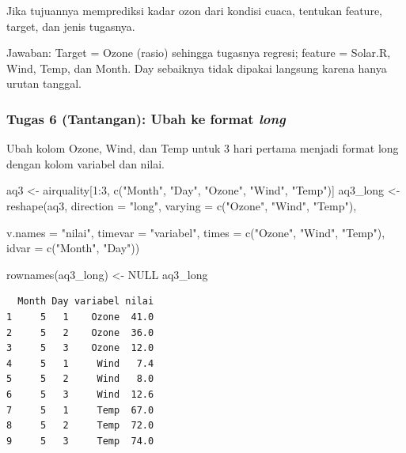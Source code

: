 \documentclass[
  indonesian,
  letterpaper,
]{book}
\newenvironment{Shaded}{\begin{snugshade}}{\end{snugshade}}
\newcommand{\AttributeTok}[1]{\textcolor[rgb]{0.40,0.45,0.13}{#1}}
\newcommand{\ConstantTok}[1]{\textcolor[rgb]{0.56,0.35,0.01}{#1}}
\newcommand{\DecValTok}[1]{\textcolor[rgb]{0.68,0.00,0.00}{#1}}
\newcommand{\FunctionTok}[1]{\textcolor[rgb]{0.28,0.35,0.67}{#1}}
\newcommand{\NormalTok}[1]{\textcolor[rgb]{0.00,0.23,0.31}{#1}}
\newcommand{\OtherTok}[1]{\textcolor[rgb]{0.00,0.23,0.31}{#1}}
\newcommand{\SpecialCharTok}[1]{\textcolor[rgb]{0.37,0.37,0.37}{#1}}
\newcommand{\StringTok}[1]{\textcolor[rgb]{0.13,0.47,0.30}{#1}}
\begin{document}
Jika tujuannya memprediksi kadar ozon dari kondisi cuaca, tentukan
feature, target, dan jenis tugasnya.

Jawaban: Target = Ozone (rasio) sehingga tugasnya regresi; feature =
Solar.R, Wind, Temp, dan Month. Day sebaiknya tidak dipakai langsung
karena hanya urutan tanggal.

\subsubsection{\texorpdfstring{Tugas 6 (Tantangan): Ubah ke format
\emph{long}}{Tugas 6 (Tantangan): Ubah ke format long}}\label{tugas-6-tantangan-ubah-ke-format-long}

Ubah kolom Ozone, Wind, dan Temp untuk 3 hari pertama menjadi format
long dengan kolom variabel dan nilai.

\begin{Shaded}
\begin{Highlighting}[]
\NormalTok{aq3 }\OtherTok{\textless{}{-}}\NormalTok{ airquality[}\DecValTok{1}\SpecialCharTok{:}\DecValTok{3}\NormalTok{, }\FunctionTok{c}\NormalTok{(}\StringTok{"Month"}\NormalTok{, }\StringTok{"Day"}\NormalTok{, }\StringTok{"Ozone"}\NormalTok{, }\StringTok{"Wind"}\NormalTok{, }\StringTok{"Temp"}\NormalTok{)]}
\NormalTok{aq3\_long }\OtherTok{\textless{}{-}} \FunctionTok{reshape}\NormalTok{(aq3, }\AttributeTok{direction =} \StringTok{"long"}\NormalTok{, }\AttributeTok{varying =} \FunctionTok{c}\NormalTok{(}\StringTok{"Ozone"}\NormalTok{, }\StringTok{"Wind"}\NormalTok{, }\StringTok{"Temp"}\NormalTok{),}

\AttributeTok{v.names =} \StringTok{"nilai"}\NormalTok{, }\AttributeTok{timevar =} \StringTok{"variabel"}\NormalTok{,}
\AttributeTok{times =} \FunctionTok{c}\NormalTok{(}\StringTok{"Ozone"}\NormalTok{, }\StringTok{"Wind"}\NormalTok{, }\StringTok{"Temp"}\NormalTok{), }\AttributeTok{idvar =} \FunctionTok{c}\NormalTok{(}\StringTok{"Month"}\NormalTok{, }\StringTok{"Day"}\NormalTok{))}

\FunctionTok{rownames}\NormalTok{(aq3\_long) }\OtherTok{\textless{}{-}} \ConstantTok{NULL}
\NormalTok{aq3\_long}
\end{Highlighting}
\end{Shaded}

\begin{verbatim}
  Month Day variabel nilai
1     5   1    Ozone  41.0
2     5   2    Ozone  36.0
3     5   3    Ozone  12.0
4     5   1     Wind   7.4
5     5   2     Wind   8.0
6     5   3     Wind  12.6
7     5   1     Temp  67.0
8     5   2     Temp  72.0
9     5   3     Temp  74.0
\end{verbatim}
\end{document}
